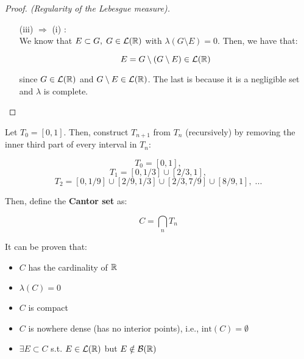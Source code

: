 \begin{proof}[Proof. (Regularity of the Lebesgue measure)]
\begin{enumerate}
        Then, $G$ is a $G_{\delta}$ set, $E \subset G$ and:

        $$ 0 \leq \lambda^{*}(G \setminus E) \leq \lambda^{*}(A_n \setminus E) < 1/n$$

        Taking the limit, we have that $\lambda(G \setminus E) = 0$.

        \item[(iii) $\Rightarrow$ (i)]: \\
        
        We know that $E \subset G, \; G \in \mathcal{L}(\mathbb{R})$ with $\lambda(G \setminus E) = 0$. 
        Then, we have that:

        $$ E = G \setminus (G \setminus E) \in \mathcal{L}(\mathbb{R})$$

        since $G \in \mathcal{L}(\mathbb{R})$ and $G \setminus E \in \mathcal{L}(\mathbb{R})$. The last is 
        because it is a negligible set and $\lambda$ is complete.

    \end{enumerate}
    
\end{proof}

\begin{fexample}
    Let $T_0 = [0, 1]$. Then, construct $T_{n+1}$ from $T_n$ (recursively) by removing the
    inner third part of every interval in $T_n$:

    $$T_0 = [0, 1], $$
    $$T_1 = [0, 1/3] \cup [2/3, 1],$$
    $$T_2 = [0, 1/9] \cup [2/9, 1/3] \cup [2/3, 7/9] \cup [8/9, 1], \; ...$$


    Then, define the \textbf{Cantor set} as:

    $$C = \bigcap_{n} T_n$$

    It can be proven that:
    \begin{itemize}
        \item $C$ has the cardinality of $\mathbb{R}$
        \item $\lambda(C) = 0$
        \item $C$ is compact
        \item $C$ is nowhere dense (has no interior points), i.e., $\text{int}(C) = \emptyset$
        \item $\exists E \subset C$ s.t. $E \in \mathcal{L}(\mathbb{R})$ but $E \notin \mathcal{B}(\mathbb{R})$
    \end{itemize}
    
\end{fexample}

